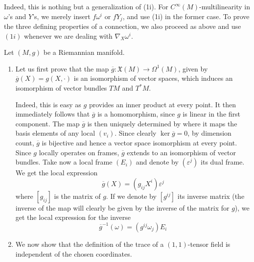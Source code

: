 \documentclass[a4paper, 12pt]{article}
\begin{document}
\begin{Exercise}
\begin{enumerate}[label=(\roman*)]
            Indeed, this is nothing but a generalization of (1i).
            For $C^\infty(M)$-multilinearity in $\omega$'s and $Y$'s,
            we merely insert $f\omega^i$ or $fY_j$, and use (1i) in the former case.
            To prove the three defining properties of a connection,
            we also proceed as above and use $(1i)$ whenever we are dealing with $\nabla_X\omega^i$.
    \end{enumerate}
\end{Exercise}

\begin{Exercise}
    Let $(M, g)$ be a Riemannian manifold.
    \begin{enumerate}[label=(\alph*)]
        \item Let us first prove that the map $\overline{g} \colon \mathfrak{X}(M) \to \Omega^1(M)$,
            given by $\overline{g}(X) = g(X, \cdot)$ is an isomorphism of vector spaces,
            which induces an isomorphism of vector bundles $TM$ and $T^*M$.

            Indeed, this is easy as $g$ provides an inner product at every point.
            It then immediately follows that $\overline{g}$ is a homomorphism, since $g$ is linear in the first component.
            The map $\overline{g}$ is then uniquely determined by where it maps the basis elements of any local $(v_i)$.
            Since clearly $\ker\overline{g} = 0$, by dimension count, $\overline{g}$ is bijective and hence a vector space isomorphism at every point.
            Since $g$ locally operates on frames, $\overline{g}$ extends to an isomorphism of vector bundles.
            Take now a local frame $(E_i)$ and denote by $(\varepsilon^j)$ its dual frame.
            We get the local expression
            \[
                \overline{g}(X) = (g_{ij}X^i)\varepsilon^j
            \]
            where $[g_{ij}]$ is the matrix of $g$.
            If we denote by $[g^{ij}]$ its inverse matrix (the inverse of the map will clearly be given by the inverse of the matrix for $g$),
            we get the local expression for the inverse
            \[
                \overline{g}^{-1}(\omega) = (g^{ij}\omega_j)E_i
            \]
        \item We now show that the definition of the trace of a $(1,1)$-tensor field is independent of the chosen coordinates.


\end{enumerate}
\end{Exercise}
\end{document}
